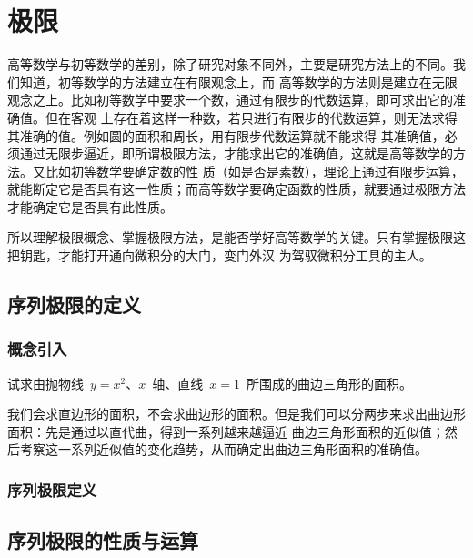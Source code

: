 

\chapter{极\emspace 限}\label{ch:2}

高等数学与初等数学的差别，除了研究对象不同外，主要是研究方法上的不同。我们知道，初等数学的方法建立在有限观念上，而
高等数学的方法则是建立在无限观念之上。比如初等数学中要求一个数，通过有限步的代数运算，即可求出它的准确值。但在客观
上存在着这样一种数，若只进行有限步的代数运算，则无法求得其准确的值。例如圆的面积和周长，用有限步代数运算就不能求得
其准确值，必须通过无限步逼近，即所谓极限方法，才能求出它的准确值，这就是高等数学的方法。又比如初等数学要确定数的性
质（如是否是素数），理论上通过有限步运算，就能断定它是否具有这一性质；而高等数学要确定函数的性质，就要通过极限方法
才能确定它是否具有此性质。

所以理解极限概念、掌握极限方法，是能否学好高等数学的关键。只有掌握极限这把钥匙，才能打开通向微积分的大门，变门外汉
为驾驭微积分工具的主人。


\section{序列极限的定义}

\subsection{概念引入}

试求由抛物线~$y=x^2$、$x$~轴、直线~$x=1$~所围成的曲边三角形的面积。

我们会求直边形的面积，不会求曲边形的面积。但是我们可以分两步来求出曲边形面积：先是通过以直代曲，得到一系列越来越逼近
曲边三角形面积的近似值；然后考察这一系列近似值的变化趋势，从而确定出曲边三角形面积的准确值。






\subsection{序列极限定义}
\begin{exercise}
\item
\end{exercise}
\section{序列极限的性质与运算}
\begin{exercise}
\item
\end{exercise}
